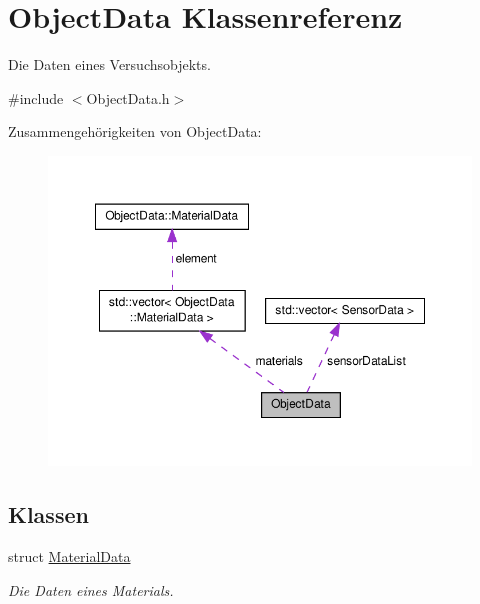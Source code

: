 \hypertarget{classObjectData}{\section{Object\-Data Klassenreferenz}
\label{classObjectData}
}


Die Daten eines Versuchsobjekts.  




{\ttfamily \#include $<$Object\-Data.\-h$>$}



Zusammengehörigkeiten von Object\-Data\-:
\nopagebreak
\begin{figure}[H]
\begin{center}
\leavevmode
\includegraphics[width=350pt]{classObjectData__coll__graph}
\end{center}
\end{figure}
\subsection*{Klassen}
\begin{DoxyCompactItemize}
\item 
struct \hyperlink{structObjectData_1_1MaterialData}{Material\-Data}
\begin{DoxyCompactList}\small\item\em Die Daten eines Materials. \end{DoxyCompactList}\end{DoxyCompactItemize}
